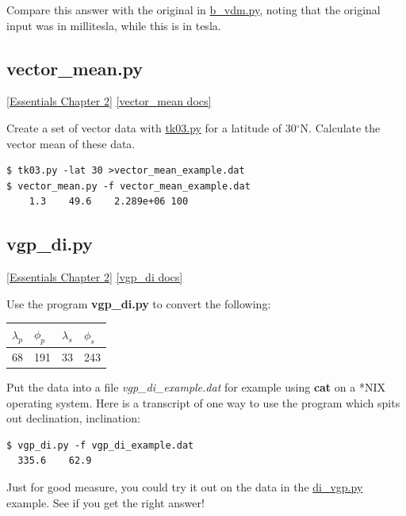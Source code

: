 \documentclass[11pt]{book}
\begin{document}
{Compare this answer with the original in \href{#b_vdm.py}{b\_vdm.py}, noting that the original input was in millitesla, while this is in tesla.




\subsection{vector\_mean.py}
\href{http://earthref.org/MAGIC/books/Tauxe/Essentials/WebBook3ch2.html#ch2}{[Essentials Chapter 2]}
\href{https://github.com/PmagPy/PmagPy/blob/master/programs/vector_mean.py}{[vector\_mean docs]}

Create a set of vector data with \href{#tk03.py}{tk03.py} for a latitude of 30$^{\circ}$N.  Calculate the vector mean of these data.

\begin{verbatim}
$ tk03.py -lat 30 >vector_mean_example.dat
$ vector_mean.py -f vector_mean_example.dat
    1.3    49.6    2.289e+06 100
\end{verbatim}


\subsection{vgp\_di.py}
\href{http://earthref.org/MAGIC/books/Tauxe/Essentials/WebBook3ch2.html#ch2}{[Essentials Chapter 2]}
\href{https://github.com/PmagPy/PmagPy/blob/master/programs/vgp_di.py}{[vgp\_di docs]}

Use the program {\bf vgp\_di.py} to convert the
following:


\begin{tabular}{llll}
\hline
$\lambda_p$\qquad &$\phi_p$ \qquad & $\lambda_s$\qquad & $\phi_s$ \\
\hline
68 \qquad & 191 \qquad & 33 \qquad & 243\\
\hline
\end{tabular}

 Put the data into a file {\it vgp\_di\_example.dat} for example using {\bf cat} on a *NIX operating system.
Here is a transcript of one way to use the program which spits out declination, inclination:

\begin{verbatim}
$ vgp_di.py -f vgp_di_example.dat
  335.6    62.9
\end{verbatim}

Just for good measure, you could try it out on the data in the \href{#di_vgp.py}{di\_vgp.py} example.  See if you get the right answer!

}
\end{document}
